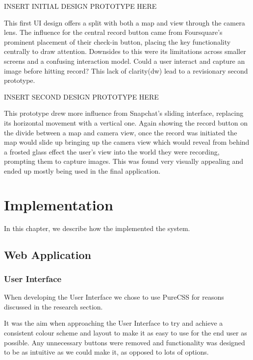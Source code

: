 \documentclass{l3proj}
\begin{document}
INSERT INITIAL DESIGN PROTOTYPE HERE

This first UI design offers a split with both a map and view through the camera
lens. The influence for the central record button came from Foursquare’s
prominent placement of their check-in button, placing the key functionality
centrally to draw attention. Downsides to this were its limitations across
smaller screens and a confusing interaction model. Could a user interact and
capture an image before hitting record? This lack of clarity(dw) lead to a
revisionary second prototype.

INSERT SECOND DESIGN PROTOTYPE HERE

This prototype drew more influence from Snapchat’s sliding interface, replacing
its horizontal movement with a vertical one. Again showing the record button on
the divide between a map and camera view, once the record was initiated the map
would slide up bringing up the camera view which would reveal from behind a
frosted glass effect the user's view into the world they were recording,
prompting them to capture images. This was found very visually appealing and
ended up mostly being used in the final application.


\chapter{Implementation}
\label{impl}

In this chapter, we describe how the implemented the system.

\section{Web Application}


\subsection{User Interface}

When developing the User Interface we chose to use PureCSS for reasons discussed in the research section.

It was the aim when approaching the User Interface to try and achieve a consistent colour scheme and layout to make it as easy to use for the end user as possible. Any unnecessary buttons were removed and functionality was designed to be as intuitive as we could make it, as opposed to lots of options.
\end{document}
